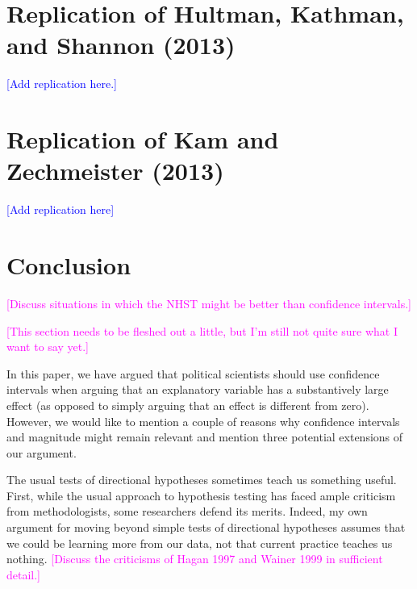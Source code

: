 \documentclass[12pt]{article}
\newcommand{\kelly}[1]{\textcolor{blue}{#1}}
\newcommand{\carlisle}[1]{\textcolor{magenta}{#1}}
\begin{document}


\section*{Replication of Hultman, Kathman, and Shannon (2013)}

\kelly{[Add replication here.]}

\section*{Replication of Kam and Zechmeister (2013)}

\kelly{[Add replication here]}

\section*{Conclusion}

\carlisle{[Discuss situations in which the NHST might be better than confidence intervals.]}


\carlisle{[This section needs to be fleshed out a little, but I'm still not quite sure what I want to say yet.]}


In this paper, we have argued that political scientists should use confidence intervals when arguing that an explanatory variable has a substantively large effect (as opposed to simply arguing that an effect is different from zero). However, we would like to mention a couple of reasons why confidence intervals and magnitude might remain relevant and mention three potential extensions of our argument.

The usual tests of directional hypotheses sometimes teach us something useful. First, while the usual approach to hypothesis testing has faced ample criticism from methodologists, some researchers defend its merits. Indeed, my own argument for moving beyond simple tests of directional hypotheses assumes that we could be learning more from our data, not that current practice teaches us nothing. \carlisle{[Discuss the criticisms of Hagan 1997 and Wainer 1999 in sufficient detail.]}
\end{document}
